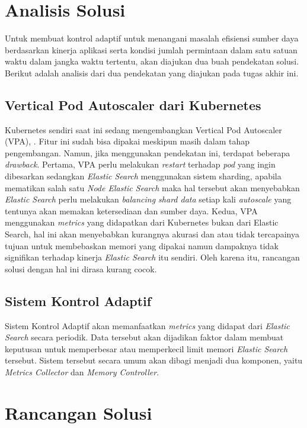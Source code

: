 \section{Analisis Solusi}

Untuk membuat kontrol adaptif untuk menangani masalah efisiensi sumber daya berdasarkan kinerja aplikasi serta kondisi jumlah permintaan dalam satu satuan waktu dalam jangka waktu tertentu, akan diajukan dua buah pendekatan solusi. Berikut adalah analisis dari dua pendekatan yang diajukan pada tugas akhir ini.

\subsection{Vertical Pod Autoscaler dari Kubernetes}

Kubernetes sendiri saat ini sedang mengembangkan Vertical Pod Autoscaler (VPA), \parencite{vpa}. Fitur ini sudah bisa dipakai meskipun masih dalam tahap pengembangan. Namun, jika menggunakan pendekatan ini, terdapat beberapa \textit{drawback}. Pertama, VPA perlu melakukan \textit{restart} terhadap \textit{pod} yang ingin dibesarkan sedangkan \textit{Elastic Search} menggunakan sistem sharding, apabila mematikan salah satu \textit{Node Elastic Search} maka hal tersebut akan menyebabkan \textit{Elastic Search} perlu melakukan \textit{balancing shard data} setiap kali \textit{autoscale} yang tentunya akan memakan ketersediaan dan sumber daya. Kedua, VPA menggunakan \textit{metrics} yang didapatkan dari Kubernetes bukan dari Elastic Search, hal ini akan menyebabkan kurangnya akurasi dan atau tidak tercapainya tujuan untuk membebaskan memori yang dipakai namun dampaknya tidak signifikan terhadap kinerja \textit{Elastic Search} itu sendiri. Oleh karena itu, rancangan solusi dengan hal ini dirasa kurang cocok.

\subsection{Sistem Kontrol Adaptif}
\label{sec:sistemkontroladaptif}

Sistem Kontrol Adaptif akan memanfaatkan \textit{metrics} yang didapat dari \textit{Elastic Search} secara periodik. Data tersebut akan dijadikan faktor dalam membuat keputusan untuk memperbesar atau memperkecil limit memori \textit{Elastic Search} tersebut. Sistem tersebut secara umum akan dibagi menjadi dua komponen, yaitu \textit{Metrics Collector} dan \textit{Memory Controller}.

\section{Rancangan Solusi}

